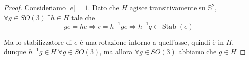 \documentclass[11pt]{article}
\theoremstyle{plain}
\theoremstyle{definition}
\theoremstyle{remark}
\DeclareMathOperator{\Stab}{Stab}
\begin{document}
\begin{proof}
  Consideriamo $|e| = 1$. Dato che $H$ agisce transitivamente su $\mathbb{S}^2$, $\forall g \in SO(3)\ \exists h \in H$ tale che
  \[ ge = he \Rightarrow e = h^{-1}ge \Rightarrow h^{-1}g \in \Stab(e) \]

  Ma lo stabilizzatore di $e$ è una rotazione intorno a quell'asse, quindi è in $H$, dunque $h^{-1}g\in H\ \forall g\in SO(3)$, ma allora $\forall g\in SO(3)$ abbiamo che $g\in H$
\end{proof}
\end{document}
